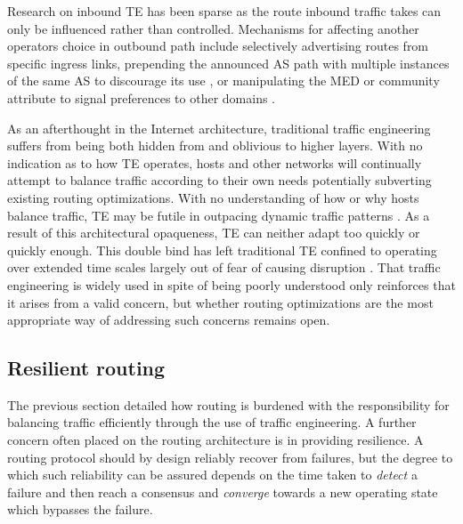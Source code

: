 Research on inbound \ac{TE} has been sparse as the route inbound traffic takes can only be influenced rather than controlled.
Mechanisms for affecting another operators choice in outbound path include selectively advertising routes from specific ingress links, prepending the announced \ac{AS} path with multiple instances of the same \ac{AS} to discourage its use \cite{Chang:2005p513}, or manipulating the \ac{MED} or community attribute to signal preferences to other domains \cite{Quoitin:2004p512}.


As an afterthought in the Internet architecture, traditional traffic engineering suffers from being both hidden from and oblivious to higher layers.
With no indication as to how \ac{TE} operates, hosts and other networks will continually attempt to balance traffic according to their own needs potentially subverting existing routing optimizations.
With no understanding of how or why hosts balance traffic, \ac{TE} may be futile in outpacing dynamic traffic patterns \cite{He:2006p504}.
As a result of this architectural opaqueness, \ac{TE} can neither adapt too quickly or quickly enough.
This double bind has left traditional \ac{TE} confined to operating over extended time scales largely out of fear of causing disruption \cite{Labovitz:1998p505}.
That traffic engineering is widely used in spite of being poorly understood only reinforces that it arises from a valid concern, but whether routing optimizations are the most appropriate way of addressing such concerns remains open.


\subsection{Resilient routing}

The previous section detailed how routing is burdened with the responsibility for balancing traffic efficiently through the use of traffic engineering. 
A further concern often placed on the routing architecture is in providing resilience.
A routing protocol should by design reliably recover from failures, but the degree to which such reliability can be assured depends on the time taken to \emph{detect} a failure and then reach a consensus and \emph{converge} towards a new operating state which bypasses the failure.

